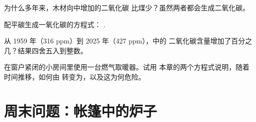 \begin{exercise}[$\star\star$]\label{exo:g8:combustion-and-fuels:9}
为什么多年来，木材向中增加的二氧化碳
比煤少？虽然两者都会生成二氧化碳。
\end{exercise}

\begin{exercise}[$\star\star$]\label{exo:g8:combustion-and-fuels:10}
配平碳生成一氧化碳的方程式：
. %
\end{exercise}

\begin{exercise}[$\star\star\star$]\label{exo:g8:combustion-and-fuels:11}
从 1959 年（316 ppm）到 2025 年（427 ppm），中的
二氧化碳含量增加了百分之几？结果四舍五入到整数。
\end{exercise}

\begin{exercise}[$\star\star\star$]\label{exo:g8:combustion-and-fuels:12}
在窗户紧闭的小房间里使用一台燃气取暖器。试用
本章的两个方程式说明，随着时间推移，如何由
转变为，以及这为何危险。
\end{exercise}

\section{周末问题：帐篷中的炉子}

